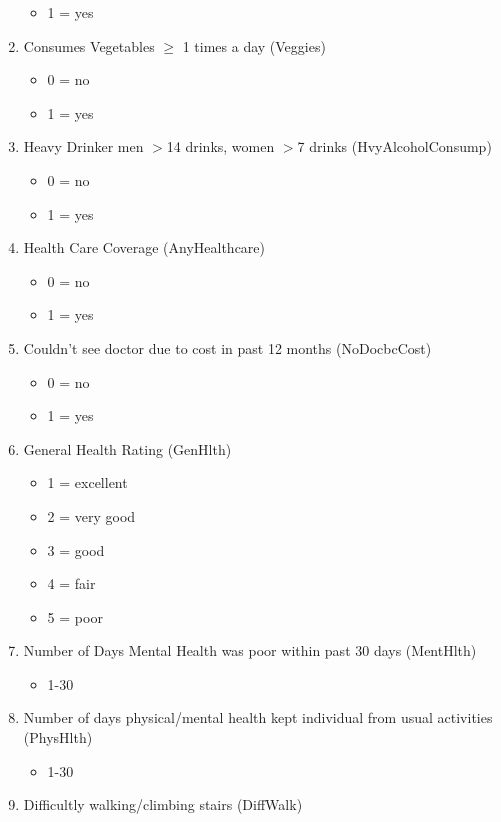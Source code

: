 \documentclass[journal]{IEEEtran}
\begin{document}
\begin{enumerate}
\begin{itemize}
    \item 1 = yes
    \end{itemize}
\item  Consumes Vegetables $\geq$ 1 times a day (Veggies)
\begin{itemize}
    \item 0 = no
    \item 1 = yes
    \end{itemize}
\item  Heavy Drinker men $>$14 drinks, women $>$7 drinks (HvyAlcoholConsump) 
\begin{itemize}
    \item 0 = no
    \item 1 = yes
    \end{itemize}
\item  Health Care Coverage (AnyHealthcare)
\begin{itemize}
    \item 0 = no
    \item 1 = yes
    \end{itemize}
\item  Couldn't see doctor due to cost in past 12 months (NoDocbcCost)
\begin{itemize}
    \item 0 = no
    \item 1 = yes
    \end{itemize}
\item  General Health Rating (GenHlth)
\begin{itemize}
    \item 1 = excellent
    \item 2 = very good 
    \item 3 = good 
    \item 4 = fair 
    \item 5 = poor 
    \end{itemize}
\item  Number of Days Mental Health was poor within past 30 days (MentHlth)
\begin{itemize}
    \item 1-30
    \end{itemize}
\item  Number of days physical/mental health kept individual from usual activities (PhysHlth)
\begin{itemize}
    \item 1-30
    \end{itemize}
\item  Difficultly walking/climbing stairs (DiffWalk)

\end{enumerate}
\end{document}

